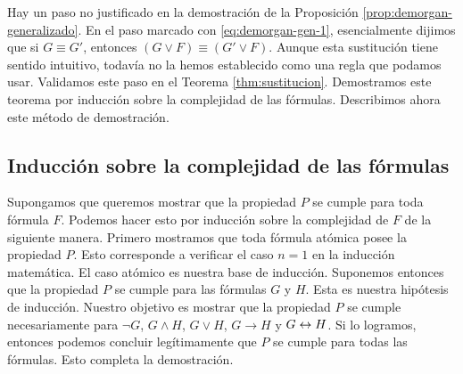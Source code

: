 \message{ !name(main.tex)}\documentclass[12pt,a4paper]{book}
\begin{document}
    Hay un paso no justificado en la demostración de la Proposición \ref{prop:demorgan-generalizado}. En el paso marcado con
    \eqref{eq:demorgan-gen-1}, esencialmente dijimos que si $G\equiv G'$, entonces $(G\vee F)\equiv(G'\vee F)$. Aunque esta
    sustitución tiene sentido intuitivo, todavía no la hemos establecido como una regla que podamos usar. Validamos este paso
    en el Teorema \ref{thm:sustitucion}. Demostramos este teorema por inducción sobre la complejidad de las fórmulas.
    Describimos ahora este método de demostración.

    \subsection{Inducción sobre la complejidad de las fórmulas}

    Supongamos que queremos mostrar que la propiedad $P$ se cumple para toda fórmula $F$. Podemos hacer esto por inducción
    sobre la complejidad de $F$ de la siguiente manera. Primero mostramos que toda fórmula atómica posee la propiedad $P$.
    Esto corresponde a verificar el caso $n=1$ en la inducción matemática. El caso atómico es nuestra base de inducción.
    Suponemos entonces que la propiedad $P$ se cumple para las fórmulas $G$ y $H$. Esta es nuestra hipótesis de inducción.
    Nuestro objetivo es mostrar que la propiedad $P$ se cumple necesariamente para $\neg G$, $G\wedge H$, $G\vee H$,
    $G\rightarrow H$ y $G\leftrightarrow H$. Si lo logramos, entonces podemos concluir legítimamente que $P$ se cumple para todas las
    fórmulas. Esto completa la demostración.
\end{document}
